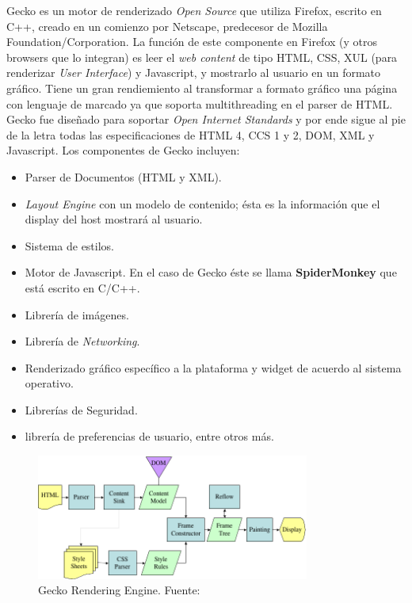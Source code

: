         Gecko es un motor de renderizado \textit{Open Source} que utiliza Firefox, escrito en C++, creado en un comienzo por Netscape, predecesor de Mozilla Foundation/Corporation. La función de este componente en Firefox (y otros browsers que lo integran) es leer el \textit{web content} de tipo HTML, CSS, XUL (para renderizar \textit{User Interface}) y Javascript, y mostrarlo al usuario en un formato gráfico. Tiene un gran rendiemiento al transformar a formato gráfico una página con lenguaje de marcado ya que soporta multithreading en el parser de HTML. Gecko fue diseñado para soportar \textit{Open Internet Standards} y por ende sigue al pie de la letra todas las especificaciones de HTML 4, CCS 1 y 2, DOM, XML y Javascript. Los componentes de Gecko incluyen:
            \begin{itemize}
                \item Parser de Documentos (HTML y XML).
                \item \textit{Layout Engine} con un modelo de contenido; ésta es la información que el display del host mostrará al usuario.
                \item Sistema de estilos.
                \item Motor de Javascript. En el caso de Gecko éste se llama \textbf{SpiderMonkey} que está escrito en C/C++.
                \item Librería de imágenes.
                \item Librería de \textit{Networking}.
                \item Renderizado gráfico específico a la plataforma y widget de acuerdo al sistema operativo.
                \item Librerías de Seguridad.
                \item librería de preferencias de usuario, entre otros más.
            \end{itemize}

        \begin{figure}[h!t]
            \centering
            \includegraphics[width=0.8\textwidth]{figures/Gecko_Overview_9.png}
            \caption{Gecko Rendering Engine. Fuente: \cite{gecko}}
            \label{fig:Gecko}
        \end{figure}

